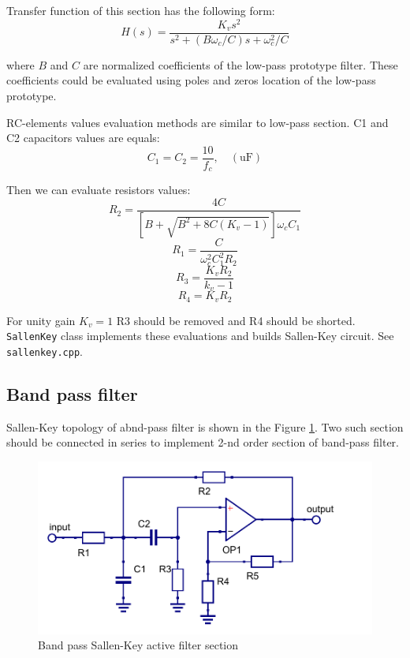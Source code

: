 Transfer function of this section has the following form:
\begin{equation}
 H(s)=\frac{K_vs^2}{s^2+(B\omega_c/C)s+\omega_c^2/C} \label{sk-hpf-trfunc}
\end{equation}

where $B$ and $C$ are normalized coefficients of the low-pass prototype filter.
These coefficients could be evaluated using poles and zeros location of the
low-pass prototype.

RC-elements values evaluation methods are similar to low-pass section. C1 and
C2 capacitors values are equals:
\begin{equation}
 C_1=C_2=\frac{10}{f_c}, \quad (\mbox{uF})
\end{equation}

Then we can evaluate resistors values:
\begin{equation}
 R_2=\frac{4C}{[B+\sqrt{B^2+8C(K_v-1)}]\omega_cC_1}
\end{equation}
\begin{equation}
 R_1=\frac{C}{\omega_c^2C_1^2R_2}
\end{equation}
\begin{equation}
 R_3=\frac{K_vR_2}{k_v-1}
\end{equation}
\begin{equation}
 R_4=K_vR_2
\end{equation}


For unity gain $K_v=1$ R3 should be removed and R4 should be shorted.
\verb|SallenKey| class implements these evaluations and builds Sallen-Key
circuit. See \verb|sallenkey.cpp|.

\subsection{Band pass filter}

Sallen-Key topology of abnd-pass filter is shown in the Figure
\ref{fig:sk-bpf}. Two such section should be connected in series to implement
2-nd order section of band-pass filter.

\begin{figure}[!ht]
  \centering
  \includegraphics[width=0.6\linewidth]{pics/sk-bpf}
  \caption{Band pass Sallen-Key active filter section}
  \label{fig:sk-bpf}
\end{figure}

